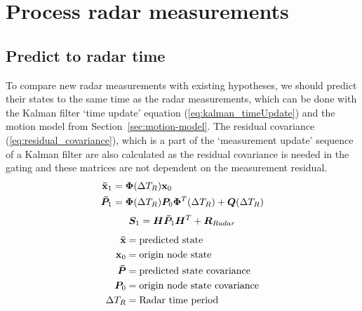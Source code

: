 \section{Process radar measurements}\label{sec:process_radar_measurements}
\subsection{Predict to radar time}
To compare new radar measurements with existing hypotheses, we should predict their states to the same time as the radar measurements, which can be done with the Kalman filter `time update' equation (\ref{eq:kalman_timeUpdate}) and the motion model from Section~\ref{sec:motion-model}. The residual covariance (\ref{eq:residual_covariance}), which is a part of the `measurement update' sequence of a Kalman filter are also calculated as the residual covariance is needed in the gating and these matrices are not dependent on the measurement residual.
\begin{equation}\label{eq:kalman_timeUpdate}
\begin{split}
\boldsymbol{\mathbf{\bar{x}}}_1 	&= \bm{\Phi}(\Delta T_R) \boldsymbol{\mathbf{x}}_0 \\
\bm{\bar{P}}_1	&= \bm{\Phi}(\Delta T_R) \bm{P}_0 \bm{\Phi}^T(\Delta T_R) + \bm{Q}(\Delta T_R) \\
\end{split}
\end{equation}
\begin{equation}\label{eq:residual_covariance}
\bm{S}_1	= \bm{H}\bm{\bar{P}}_1 \bm{H}^T + \bm{R}_{Radar}
\end{equation}
\begin{equation*}
\begin{split}
\boldsymbol{\mathbf{\bar{x}}}		&= \text{predicted state} \\
\boldsymbol{\mathbf{x}}_0 		&= \text{origin node state} \\
\bm{\bar{P}} 	&= \text{predicted state covariance} \\
\bm{P}_0 		&= \text{origin node state covariance} \\
\Delta T_R 		&= \text{Radar time period} \\
\end{split}
\end{equation*}

